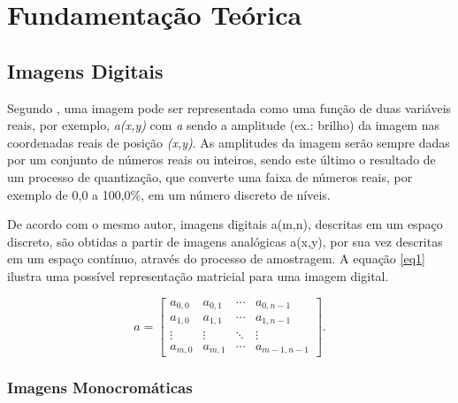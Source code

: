 \chapter[Fundamentação Teórica]{Fundamentação Teórica}

\section{Imagens Digitais}

Segundo \cite{young1998fundamentals}, uma imagem pode ser representada como uma função de duas variáveis reais, por exemplo, \textit{a(x,y)} com \textit{a} sendo a amplitude (ex.: brilho) da imagem nas coordenadas reais de posição \textit{(x,y)}. As amplitudes da imagem serão sempre dadas por um conjunto de números reais ou inteiros, sendo este último o resultado de um processo de quantização, que converte uma faixa de números reais, por exemplo de 0,0 a 100,0\%, em um número discreto de níveis.

De acordo com o mesmo autor, imagens digitais a(m,n), descritas em um espaço discreto, são obtidas a partir de imagens analógicas a(x,y), por sua vez descritas em um espaço contínuo,  através do processo de amostragem. A equação \ref{eq1} ilustra uma possível representação matricial para uma imagem digital.
\vspace{-1cm}
\begin{center}
	\begin{equation}
	a =
	\begin{bmatrix}
  		a_{0,0} & a_{0,1} & \cdots & a_{0,n-1} \\
  		a_{1,0} & a_{1,1} & \cdots & a_{1,n-1} \\
  		\vdots  & \vdots  & \ddots & \vdots  \\
  		a_{m,0} & a_{m,1} & \cdots & a_{m-1,n-1}
	\end{bmatrix}.
	\label{eq1} 
	\end{equation}
\end{center}


\subsection{Imagens Monocromáticas}
	
